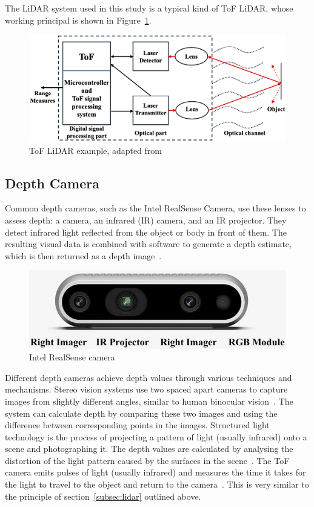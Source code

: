 The LiDAR system used in this study is a typical kind of ToF LiDAR, whose working principal is shown in Figure~\ref{fig:lidar_example}.

\begin{figure}[H]
    \centering
    \includegraphics[width=1\linewidth]{figs/tof.png}
    \caption{ToF LiDAR example, adapted from~\cite{lidarexample}}
    \label{fig:lidar_example}
\end{figure}

\subsection{Depth Camera}
Common depth cameras, such as the Intel RealSense Camera, use these lenses to assess depth: 
a camera, an infrared (IR) camera, and an IR projector. 
They detect infrared light reflected from the object or body in front of them. 
The resulting visual data is combined with software to generate a depth estimate, 
which is then returned as a depth image~\cite{depthcam}.

\begin{figure}[H]
    \centering
    \includegraphics[width=1.0\linewidth]{figs/realsense.jpg}
    \caption{Intel RealSense camera}
\end{figure}

Different depth cameras achieve depth values through various techniques and mechanisms. 
Stereo vision systems use two spaced apart cameras to capture images from slightly different angles, 
similar to human binocular vision~\cite{kinect}. 
The system can calculate depth by comparing these two images and using the difference between corresponding points in the images. 
Structured light technology is the process of projecting a pattern of light (usually infrared) onto a scene and photographing it. 
The depth values are calculated by analysing the distortion of the light pattern caused by the surfaces in the scene~\cite{rgbdmapping}.
The ToF camera emits pulses of light (usually infrared) and measures the time it takes for the light to travel to the object and return to the camera~\cite{tof}. 
This is very similar to the principle of section~\ref{subsec:lidar} outlined above.

